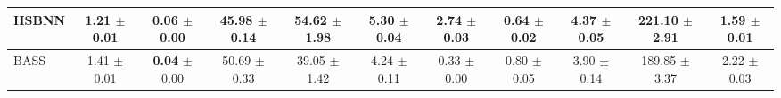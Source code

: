 \begin{table}[t]
{\begin{tabular}{lcccccccccc}
\midrule
\shortstack[l]{HSBNN \\ {}} & \shortstack{1.21 \\ $\pm$ 0.01} & \shortstack{0.06 \\ $\pm$ 0.00} & \shortstack{45.98 \\ $\pm$ 0.14} & \shortstack{54.62 \\ $\pm$ 1.98} & \shortstack{5.30 \\ $\pm$ 0.04} & \shortstack{2.74 \\ $\pm$ 0.03} & \shortstack{0.64 \\ $\pm$ 0.02} & \shortstack{4.37 \\ $\pm$ 0.05} & \shortstack{221.10 \\ $\pm$ 2.91} & \shortstack{\textbf{1.59} \\ $\pm$ 0.01} \\
\midrule
\shortstack[l]{BASS \\ {}} & \shortstack{1.41 \\ $\pm$ 0.01} & \shortstack{\textbf{0.04} \\ $\pm$ 0.00} & \shortstack{50.69 \\ $\pm$ 0.33} & \shortstack{39.05 \\ $\pm$ 1.42} & \shortstack{4.24 \\ $\pm$ 0.11} & \shortstack{0.33 \\ $\pm$ 0.00} & \shortstack{0.80 \\ $\pm$ 0.05} & \shortstack{3.90 \\ $\pm$ 0.14} & \shortstack{189.85 \\ $\pm$ 3.37} & \shortstack{2.22 \\ $\pm$ 0.03} \\
\bottomrule
\end{tabular}
}
\end{table}

